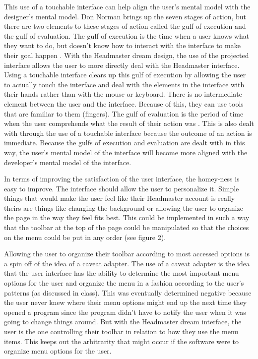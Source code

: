 \documentclass{article}
\begin{document}
This use of a touchable interface can help align the user's mental model with the designer's mental model. Don Norman brings up the seven stages of action, but there are two elements to these stages of action called the gulf of execution and the gulf of evaluation. The gulf of execution is the time when a user knows what they want to do, but doesn't know how to interact with the interface to make their goal happen \cite{gulf}. With the Headmaster dream design, the use of the projected interface allows the user to more directly deal with the Headmaster interface. Using a touchable interface clears up this gulf of execution by allowing the user to actually touch the interface and deal with the elements in the interface with their hands rather than with the mouse or keyboard. There is no intermediate element between the user and the interface. Because of this, they can use tools that are familiar to them (fingers). The gulf of evaluation is the period of time when the user comprehends what the result of their action was \cite{gulf}. This is also dealt with through the use of a touchable interface because the outcome of an action is immediate. Because the gulfs of execution and evaluation are dealt with in this way, the user's mental model of the interface will become more aligned with the developer's mental model of the interface.

In terms of improving the satisfaction of the user interface, the homey-ness is easy to improve. The interface should allow the user to personalize it. Simple things that would make the user feel like their Headmaster account is really theirs are things like changing the background or allowing the user to organize the page in the way they feel fits best. This could be implemented in such a way that the toolbar at the top of the page could be manipulated so that the choices on the menu could be put in any order (see figure 2).

Allowing the user to organize their toolbar according to most accessed options is a spin off of the idea of a caveat adapter. The use of a caveat adapter is the idea that the user interface has the ability to determine the most important menu options for the user and organize the menu in a fashion according to the user's patterns (as discussed in class). This was eventually determined negative because the user never knew where their menu options might end up the next time they opened a program since the program didn't have to notify the user when it was going to change things around. But with the Headmaster dream interface, the user is the one controlling their toolbar in relation to how they use the menu items. This keeps out the arbitrarity that might occur if the software were to organize menu options for the user.
\end{document}
